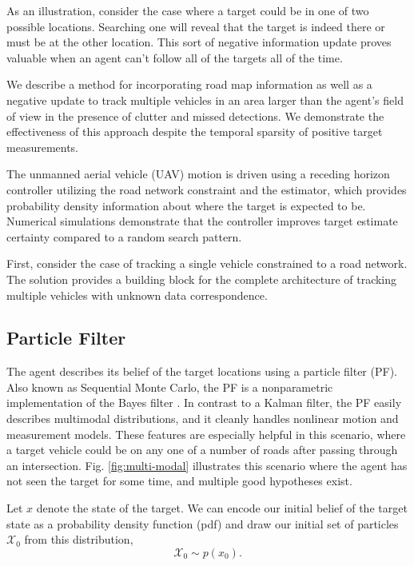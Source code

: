 \documentclass[letterpaper, 10 pt, conference]{ieeeconf}  %
\begin{document}
As an illustration, consider the case where a target could be in one of two possible locations. Searching one will reveal that the target is indeed there or must be at the other location. This sort of negative information update proves valuable when an agent can't follow all of the targets all of the time.

We describe a method for incorporating road map information as well as a negative update to track multiple vehicles in an area larger than the agent's field of view in the presence of clutter and missed detections. We demonstrate the effectiveness of this approach despite the temporal sparsity of positive target measurements.

The unmanned aerial vehicle (UAV) motion is driven using a receding horizon controller utilizing the road network constraint and the estimator, which provides probability density information about where the target is expected to be. Numerical simulations demonstrate that the controller improves target estimate certainty compared to a random search pattern.

First, consider the case of tracking a single vehicle constrained to a road network. The solution provides a building block for the complete architecture of tracking multiple vehicles with unknown data correspondence.

\subsection{Particle Filter}

The agent describes its belief of the target locations using a particle filter (PF). Also known as Sequential Monte Carlo, the PF is a nonparametric implementation of the Bayes filter \cite{Arulampalam2002}. In contrast to a Kalman filter, the PF easily describes multimodal distributions, and it cleanly handles nonlinear motion and measurement models. These features are especially helpful in this scenario, where a target vehicle could be on any one of a number of roads after passing through an intersection. Fig. \ref{fig:multi-modal} illustrates this scenario where the agent has not seen the target for some time, and multiple good hypotheses exist.

Let $x$ denote the state of the target. We can encode our initial belief of the target state as a probability density function (pdf) and draw our initial set of particles $\mathcal{X}_0$ from this distribution,
\begin{equation}%
    \mathcal{X}_0 \sim p(x_0).
\end{equation}
\end{document}
